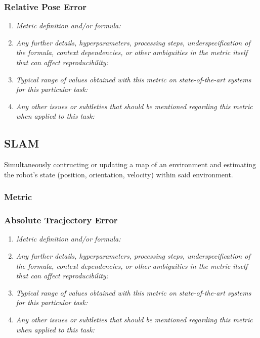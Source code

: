 \documentclass[a4paper,11pt]{article}
\begin{document}
        \subsubsection{Relative Pose Error}
            \begin{enumerate}[label=\alph*.]
                \item \textit{Metric definition and/or formula:}
                \bigskip
                \item \textit{Any further details, hyperparameters, processing steps, underspecification of the formula, context dependencies, or other ambiguities in the metric itself that can affect reproducibility:}
                \bigskip
                \item \textit{Typical range of values obtained with this metric on state-of-the-art systems for this particular task:}
                \bigskip
                \item \textit{Any other issues or subtleties that should be mentioned regarding this metric when applied to this task:}
                \bigskip
            \end{enumerate}
    \subsection{SLAM} \label{slam}
        Simultaneously contructing or updating a map of an environment and estimating the robot's state (position, orientation, velocity) within said environment.
        \subsubsection{Metric}
            \subsubsection{Absolute Tracjectory Error}
                \begin{enumerate}[label=\alph*.]
                    \item \textit{Metric definition and/or formula:}
                    \bigskip
                    \item \textit{Any further details, hyperparameters, processing steps, underspecification of the formula, context dependencies, or other ambiguities in the metric itself that can affect reproducibility:}
                    \bigskip
                    \item \textit{Typical range of values obtained with this metric on state-of-the-art systems for this particular task:}
                    \bigskip
                    \item \textit{Any other issues or subtleties that should be mentioned regarding this metric when applied to this task:}
                    \bigskip
                \end{enumerate}
\end{document}
